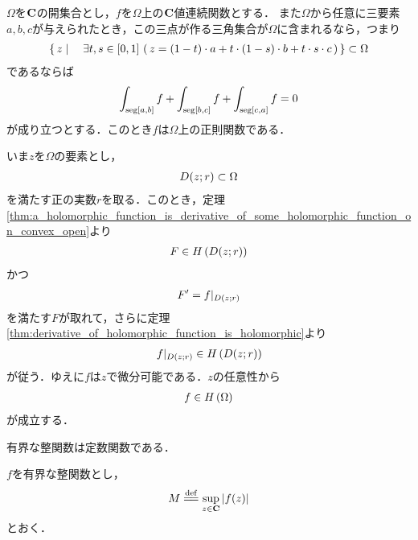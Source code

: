 	\begin{screen}
		\begin{thm}[Moreraの定理]
			$\Omega$を$\mathbf{C}$の開集合とし，$f$を$\Omega$上の$\mathbf{C}$値連続関数とする．
			また$\Omega$から任意に三要素$a,b,c$が与えられたとき，この三点が作る三角集合が$\Omega$に含まれるなら，つまり
			\begin{align}
				\left\{\, z \mid \quad \exists t,s \in [0,1]\, 
				\left(\, z = (1-t) \cdot a 
				+ t \cdot (1-s) \cdot b 
				+ t \cdot s \cdot c\, \right)\, \right\}
				\subset \Omega
			\end{align}
			であるならば
			\begin{align}
				\int_{\operatorname{seg}[a,b]} f + \int_{\operatorname{seg}[b,c]} f + \int_{\operatorname{seg}[c,a]} f = 0
			\end{align}
			が成り立つとする．このとき$f$は$\Omega$上の正則関数である．
		\end{thm}
	\end{screen}
	
	\begin{sketch}
		いま$z$を$\Omega$の要素とし，
		\begin{align}
			D(z;r) \subset \Omega
		\end{align}
		を満たす正の実数$r$を取る．このとき，定理\ref{thm:a_holomorphic_function_is_derivative_of_some_holomorphic_function_on_convex_open}より
		\begin{align}
			F \in H\left(D(z;r)\right)
		\end{align}
		かつ
		\begin{align}
			F' = f|_{D(z;r)}
		\end{align}
		を満たす$F$が取れて，さらに定理\ref{thm:derivative_of_holomorphic_function_is_holomorphic}より
		\begin{align}
			f|_{D(z;r)} \in H\left(D(z;r)\right)
		\end{align}
		が従う．ゆえに$f$は$z$で微分可能である．$z$の任意性から
		\begin{align}
			f \in H\left(\Omega\right)
		\end{align}
		が成立する．
		\QED
	\end{sketch}
		
	\begin{screen}
		\begin{thm}[Liouvilleの定理]
			有界な整関数は定数関数である．
		\end{thm}
	\end{screen}
	
	\begin{sketch}
		$f$を有界な整関数とし，
		\begin{align}
			M \defeq \sup{z \in \C}{|f(z)|}
		\end{align}
		とおく．
	\end{sketch}